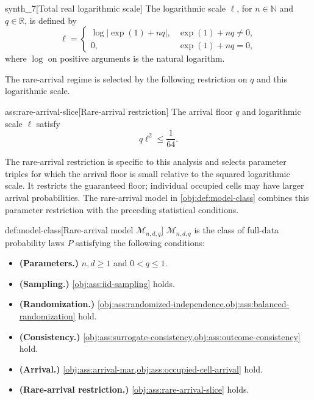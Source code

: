 \documentclass[11pt]{article}
\begin{document}
\begin{definitionv}{synth_7}[Total real logarithmic scale]
The logarithmic scale \(\ell\), for \(n\in\mathbb N\) and \(q\in\mathbb R\), is defined by
\[
\ell=
\begin{cases}
\log\bigl|\exp(1)+nq\bigr|, & \exp(1)+nq\ne 0,\\
0, & \exp(1)+nq=0,
\end{cases}
\]
where \(\log\) on positive arguments is the natural logarithm.
\end{definitionv}

The rare-arrival regime is selected by the following restriction on \(q\) and this logarithmic scale.

\begin{assumptionv}{ass:rare-arrival-slice}[Rare-arrival restriction]
The arrival floor \(q\) and logarithmic scale \(\ell\) satisfy
\[
q\ell^2\le \frac{1}{64}.
\]
\end{assumptionv}

The rare-arrival restriction is specific to this analysis and selects parameter triples for which the arrival floor is small relative to the squared logarithmic scale. It restricts the guaranteed floor; individual occupied cells may have larger arrival probabilities. The rare-arrival model  in \cref{obj:def:model-class} combines this parameter restriction with the preceding statistical conditions.

\begin{definitionv}{def:model-class}[Rare-arrival model \(\mathcal M_{n,d,q}\)]
\(\mathcal M_{n,d,q}\) is the class of full-data probability laws \(P\) satisfying the following conditions:
\begin{itemize}
\item \textbf{(Parameters.)} \(n,d\ge1\) and \(0<q\le1\).
\item \textbf{(Sampling.)} \cref{obj:ass:iid-sampling} holds.
\item \textbf{(Randomization.)} \cref{obj:ass:randomized-independence,obj:ass:balanced-randomization} hold.
\item \textbf{(Consistency.)} \cref{obj:ass:surrogate-consistency,obj:ass:outcome-consistency} hold.
\item \textbf{(Arrival.)} \cref{obj:ass:arrival-mar,obj:ass:occupied-cell-arrival} hold.
\item \textbf{(Rare-arrival restriction.)} \cref{obj:ass:rare-arrival-slice} holds.
\end{itemize}
\end{definitionv}
\end{document}
